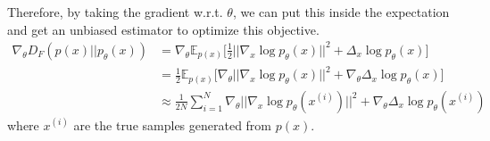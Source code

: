 \documentclass{article}
\begin{document}
    Therefore, by taking the gradient w.r.t. $\theta$, we can put this inside the expectation and get an unbiased estimator to optimize this objective. 
    \begin{align}
      \nabla_\theta  D_F (p(x) || p_\theta (x)) & = \nabla_\theta \mathbb{E}_{p(x)} \bigg[ \frac{1}{2} || \nabla_x \log p_\theta (x) ||^2 + \Delta_x \log p_\theta (x) \bigg] \\
                                                & = \frac{1}{2} \mathbb{E}_{p(x)} \bigg[ \nabla_\theta || \nabla_x \log p_\theta (x) ||^2 + \nabla_\theta \Delta_x \log p_\theta (x) \bigg] \\ 
                                                & \approx \frac{1}{2N} \sum_{i=1}^N \nabla_\theta || \nabla_x \log p_\theta (x^{(i)}) ||^2 + \nabla_\theta \Delta_x \log p_\theta (x^{(i)}) 
    \end{align}
    where $x^{(i)}$ are the true samples generated from $p(x)$. 
\end{document}
